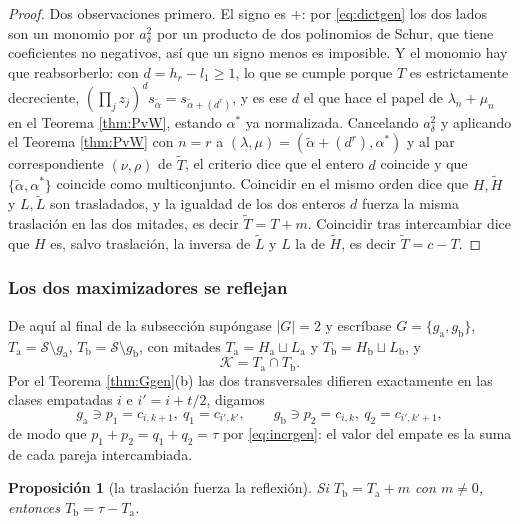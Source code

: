 \documentclass[11pt,reqno]{amsart}
\theoremstyle{plain}
\newtheorem{proposition}[theorem]{Proposición}
\theoremstyle{definition}
\begin{document}
\begin{proof}
Dos observaciones primero. El signo es $+$: por \eqref{eq:dictgen} los dos lados son un monomio por
$a_\delta^2$ por un producto de dos polinomios de Schur, que tiene coeficientes no negativos, así que
un signo menos es imposible. Y el monomio hay que reabsorberlo: con $d=h_r-l_1\ge1$, lo que se cumple
porque $T$ es estrictamente decreciente, $(\prod_j z_j)^{d}s_{\tilde\alpha}=s_{\tilde\alpha+(d^{r})}$,
y es ese $d$ el que hace el papel de $\lambda_n+\mu_n$ en el Teorema \ref{thm:PvW}, estando
$\alpha^{*}$ ya normalizada. Cancelando $a_\delta^2$ y aplicando el Teorema \ref{thm:PvW} con $n=r$ a
$(\lambda,\mu)=(\tilde\alpha+(d^{r}),\alpha^{*})$ y al par correspondiente $(\nu,\rho)$ de
$\widetilde T$, el criterio dice que el entero $d$ coincide y que $\{\tilde\alpha,\alpha^{*}\}$
coincide como multiconjunto. Coincidir en el mismo orden dice que $H,\widetilde H$ y $L,\widetilde L$
son trasladados, y la igualdad de los dos enteros $d$ fuerza la misma traslación en las dos mitades,
es decir $\widetilde T=T+m$. Coincidir tras intercambiar dice que $H$ es, salvo traslación, la
inversa de $\widetilde L$ y $L$ la de $\widetilde H$, es decir $\widetilde T=c-T$.
\end{proof}

\subsubsection*{Los dos maximizadores se reflejan}

De aquí al final de la subsección supóngase $|G|=2$ y escríbase
$G=\{g_{\mathrm a},g_{\mathrm b}\}$, $T_{\mathrm a}=\mathcal{S}\setminus g_{\mathrm a}$,
$T_{\mathrm b}=\mathcal{S}\setminus g_{\mathrm b}$, con mitades
$T_{\mathrm a}=H_{\mathrm a}\sqcup L_{\mathrm a}$ y $T_{\mathrm b}=H_{\mathrm b}\sqcup L_{\mathrm b}$,
y
\[
  \mathcal{K}=T_{\mathrm a}\cap T_{\mathrm b}.
\]
Por el Teorema \ref{thm:Ggen}(b) las dos transversales difieren exactamente en las clases empatadas
$i$ e $i'=i+t/2$, digamos
\begin{equation}\label{eq:swapgen}
  g_{\mathrm a}\ni p_1=c_{i,k+1},\ q_1=c_{i',k'},\qquad
  g_{\mathrm b}\ni p_2=c_{i,k},\ q_2=c_{i',k'+1},
\end{equation}
de modo que $p_1+p_2=q_1+q_2=\tau$ por \eqref{eq:incrgen}: el valor del empate es la suma de cada
pareja intercambiada.

\begin{proposition}[la traslación fuerza la reflexión]\label{prop:translgen}
Si $T_{\mathrm b}=T_{\mathrm a}+m$ con $m\ne0$, entonces $T_{\mathrm b}=\tau-T_{\mathrm a}$.
\end{proposition}
\end{document}
